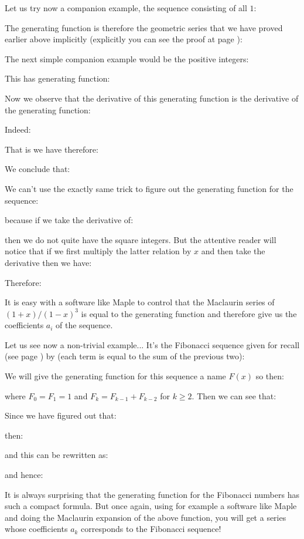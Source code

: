 	Let us try now a companion example, the sequence consisting of all $1$:
	
	The generating function is therefore the geometric series that we have proved earlier above implicitly (explicitly you can see the proof at page \pageref{sum of powers}):
	
	The next simple companion example would be the positive integers:
	
	This has generating function:
	
	Now we observe that the derivative of this generating function is the derivative of the generating function:
	
	Indeed:
	
	That is we have therefore:
	
	We conclude that:
	
	We can't use the exactly same trick to figure out the generating function for the sequence:
	
	because if we take the derivative of:
	
	then we do not quite have the square integers. But the attentive reader will notice that if we first multiply the latter relation by $x$ and then take the derivative then we have:
	
	Therefore:
	
	It is easy with a software like Maple to control that the Maclaurin series of $(1+x)/(1-x)^3$ is equal to the generating function and therefore give us the coefficients $a_i$ of the sequence.
	
	Let us see now a non-trivial example... It's the Fibonacci sequence given for recall (see page \pageref{Fibonacci Sequence}) by (each term is equal to the sum of the previous two):
	
	We will give the generating function for this sequence a name $F(x)$ so then:
	
	where $F_0=F_1=1$ and $F_k=F_{k-1}+F_{k-2}$ for $k\geq 2$. Then we can see that:
	
	Since we have figured out that:
	
	then:
	
	and this can be rewritten as:
	
	and hence:
	
	It is always surprising that the generating function for the Fibonacci numbers has such a compact formula. But once again, using for example a software like Maple and doing the Maclaurin expansion of the above function, you will get a series whose coefficients $a_k$ corresponds to the Fibonacci sequence!
	
